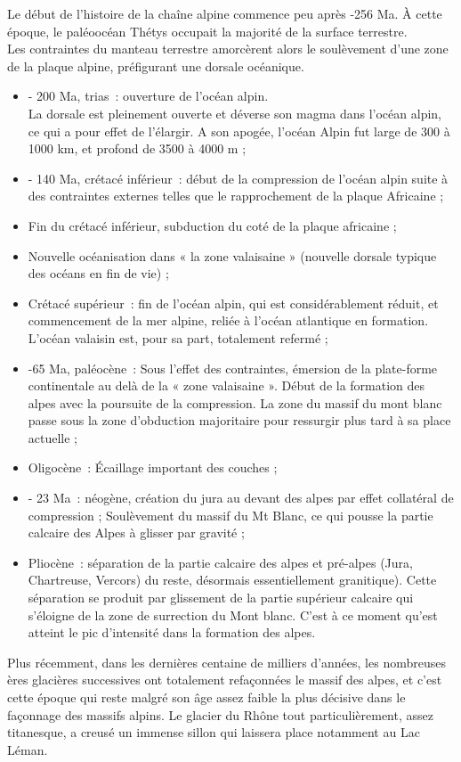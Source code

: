 \documentclass[a4paper,11pt]{article}
\begin{document}
Le début de l'histoire de la chaîne alpine commence peu après -256 Ma. À cette époque, le paléoocéan Thétys occupait la majorité de la surface terrestre. \\
Les contraintes du manteau terrestre amorcèrent alors le soulèvement d'une zone de la plaque alpine, préfigurant une dorsale océanique.
\begin{itemize}
  \item - 200 Ma, trias~: ouverture de l'océan alpin.\\
  La dorsale est pleinement ouverte et déverse son  magma dans l'océan alpin, ce qui a pour effet de l'élargir.
  A son apogée, l'océan Alpin fut large de 300 à 1000 km, et profond de 3500 à 4000 m ;
  \item - 140 Ma, crétacé inférieur~: début de la compression de l'océan alpin suite à des contraintes externes telles que le rapprochement de la plaque Africaine ;
  \item Fin du crétacé inférieur, subduction du coté de la plaque africaine ;
  \item Nouvelle océanisation dans « la zone valaisaine » (nouvelle dorsale typique des océans en fin de vie) ;
  \item Crétacé supérieur~: fin de l'océan alpin, qui est considérablement réduit, et commencement de la mer alpine, reliée à l'océan atlantique en formation. L'océan valaisin est, pour sa part, totalement refermé ;
  \item -65 Ma, paléocène~: Sous l'effet des contraintes, émersion de la plate-forme continentale au delà de la « zone valaisaine ».
  Début de la formation des alpes avec la poursuite de la compression.
  La zone du massif du mont blanc passe sous la zone d'obduction majoritaire pour ressurgir plus tard à sa place actuelle ;
  \item Oligocène~: Écaillage important des couches ;
  \item - 23 Ma~: néogène, création du jura au devant des alpes par effet collatéral de compression ;
  Soulèvement du massif du Mt Blanc, ce qui pousse la partie calcaire des Alpes à glisser par gravité ;
  \item Pliocène~: séparation de la partie calcaire des alpes et pré-alpes (Jura, Chartreuse, Vercors) du reste, désormais essentiellement granitique). Cette séparation se produit par glissement de la partie supérieur calcaire qui s'éloigne de la zone de surrection du Mont blanc.
  C'est à ce moment qu'est atteint le pic d'intensité dans la formation des alpes.
\end{itemize}
Plus récemment, dans les dernières centaine de milliers d'années, les nombreuses ères glacières successives ont totalement refaçonnées le massif des alpes, et c'est cette époque qui reste malgré son âge assez faible la plus décisive dans le façonnage des massifs alpins.
  Le glacier du Rhône tout particulièrement, assez titanesque, a creusé un immense sillon qui laissera place notamment au Lac Léman.
\end{document}
